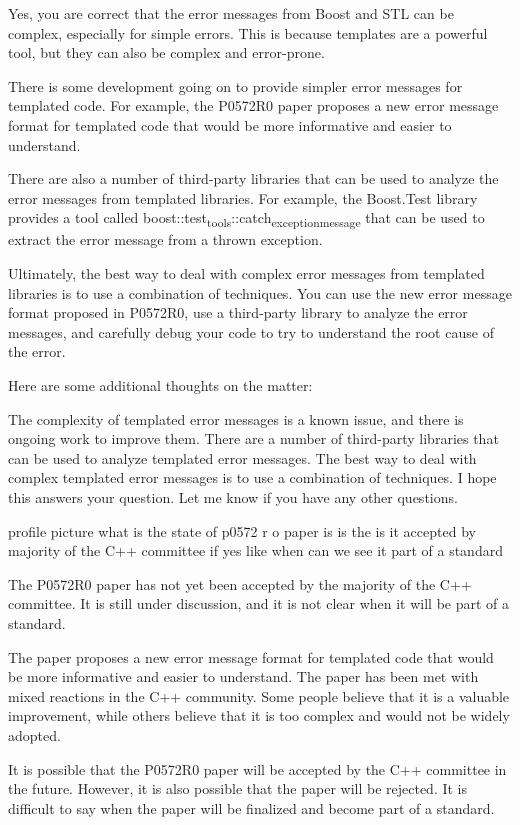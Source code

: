 \documentclass[11pt]{article}
\begin{document}
Yes, you are correct that the error messages from Boost and STL can be complex, especially for simple errors. This is because templates are a powerful tool, but they can also be complex and error-prone.

There is some development going on to provide simpler error messages for templated code. For example, the P0572R0 paper proposes a new error message format for templated code that would be more informative and easier to understand.

There are also a number of third-party libraries that can be used to analyze the error messages from templated libraries. For example, the Boost.Test library provides a tool called boost::test\textsubscript{tools}::catch\textsubscript{exception}\textsubscript{message} that can be used to extract the error message from a thrown exception.

Ultimately, the best way to deal with complex error messages from templated libraries is to use a combination of techniques. You can use the new error message format proposed in P0572R0, use a third-party library to analyze the error messages, and carefully debug your code to try to understand the root cause of the error.

Here are some additional thoughts on the matter:

The complexity of templated error messages is a known issue, and there is ongoing work to improve them.
There are a number of third-party libraries that can be used to analyze templated error messages.
The best way to deal with complex templated error messages is to use a combination of techniques.
I hope this answers your question. Let me know if you have any other questions.

profile picture
what is the state of p0572
r o
paper
is
is the is it accepted by majority of the C++ committee
if yes like when can we see it part of a standard

The P0572R0 paper has not yet been accepted by the majority of the C++ committee. It is still under discussion, and it is not clear when it will be part of a standard.

The paper proposes a new error message format for templated code that would be more informative and easier to understand. The paper has been met with mixed reactions in the C++ community. Some people believe that it is a valuable improvement, while others believe that it is too complex and would not be widely adopted.

It is possible that the P0572R0 paper will be accepted by the C++ committee in the future. However, it is also possible that the paper will be rejected. It is difficult to say when the paper will be finalized and become part of a standard.
\end{document}
